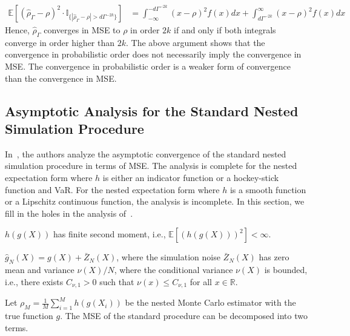 \begin{align*}
    \mathbb{E} \left[ \left(\hat{\rho}_{\Gamma} - \rho\right)^2 \cdot \mathbb{I}_{\{|\hat{\rho}_{\Gamma} - \rho| > d\Gamma^{-2k}\}} \right] 
    & = \int_{-\infty}^{-d\Gamma^{-2k}} (x - \rho)^2 f(x) dx + \int_{d\Gamma^{-2k}}^{\infty} (x - \rho)^2 f(x) dx 
\end{align*}
Hence, $\hat{\rho}_{\Gamma}$ converges in MSE to $\rho$ in order $2k$ if and only if both integrals converge in order higher than $2k$. 
The above argument shows that the convergence in probabilistic order does not necessarily imply the convergence in MSE.
The convergence in probabilistic order is a weaker form of convergence than the convergence in MSE.

\subsection{Asymptotic Analysis for the Standard Nested Simulation Procedure}
In~\cite{gordy2010nested}, the authors analyze the asymptotic convergence of the standard nested simulation procedure in terms of MSE. 
The analysis is complete for the nested expectation form where $h$ is either an indicator function or a hockey-stick function and VaR. 
For the nested expectation form where $h$ is a smooth function or a Lipschitz continuous function, the analysis is incomplete.
In this section, we fill in the holes in the analysis of~\cite{gordy2010nested}.

\begin{assumption} \label{as1:sns}
    $h(g(X))$ has finite second moment, i.e., $\mathbb{E} \left[ \left( h(g(X)) \right)^2 \right] < \infty$.
\end{assumption}

\begin{assumption} \label{as1:sns-noise}
    $\hat{g}_N(X) = g(X) + \bar{Z}_N(X)$, where the simulation noise $\bar{Z}_N(X)$ has zero mean and variance $\nu(X) / N$, where the conditional variance $\nu(X)$ is bounded, i.e., there exists $C_{\nu, 1} > 0$ such that $\nu(x) \leq C_{\nu, 1}$ for all $x \in \mathbb{R}$. 
\end{assumption}

Let $\rho_M = \frac{1}{M} \sum_{i=1}^M h(g(X_i))$ be the nested Monte Carlo estimator with the true function $g$.
The MSE of the standard procedure can be decomposed into two terms.

